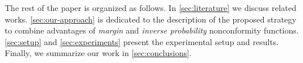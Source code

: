 The rest of the paper is organized as follows. In \cref{sec:literature} we discuss related works. \cref{sec:our-approach} is dedicated to the description of the proposed strategy to combine advantages of \textit{margin} and \textit{inverse probability} nonconformity functions. \cref{sec:setup} and \cref{sec:experiments} present the experimental setup and results. Finally, we summarize our work in \cref{sec:conclusions}.




